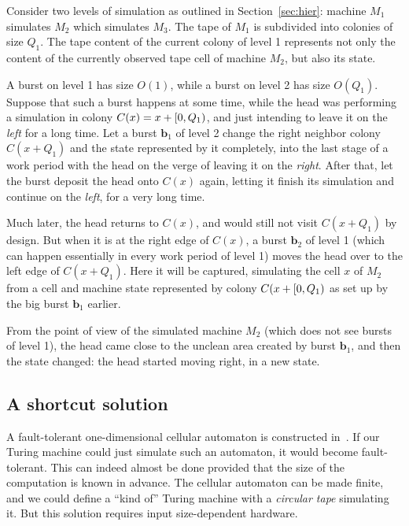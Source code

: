 \documentclass[12pt]{memoir}
\newcommand{\Q}{Q}
\begin{document}
\begin{example}[Uncleanness]
Consider two levels of simulation as outlined in Section~\ref{sec:hier}: 
machine \( M_{1} \) simulates \( M_{2} \) which simulates \( M_{3} \).
The tape of \( M_{1} \) is subdivided into colonies of size \( \Q_{1} \).
The tape content of the 
current colony of level 1 represents not only the content of the currently
observed tape cell of machine \( M_{2} \), but also its state.

A burst on level 1 has size \( O(1) \), while a burst on level 2 has size \( O(\Q_{1}) \).
Suppose that such a burst happens at some time, while the head was
performing a simulation in colony \( C(x)=x+\lint{0}{\Q_{1}} \),
and just intending to leave it on the \emph{left} for a long time.
Let a burst \( \mathbf{b}_{1} \) of level 2 change the right neighbor colony \( C(x+\Q_{1}) \) 
and the state represented by it 
completely, into the last stage of a work period with the 
head on the verge of leaving it on the \emph{right}.
After that, let the burst deposit the head onto \( C(x) \) again, letting it finish
its simulation and continue on the \emph{left}, for a very long time.

Much later, the head returns to \( C(x) \), and would still not visit \( C(x+\Q_{1}) \) by
design.
But when it is at the right edge of \( C(x) \),
a burst \( \mathbf{b}_{2} \) of level 1 (which can happen essentially in every work period of level 1)
moves the head over to the left edge of \( C(x+\Q_{1}) \).
Here it will be captured, simulating the cell \( x \) of \( M_{2} \) from a cell and machine state 
represented by colony \( C(x+\lint{0}{\Q_{1}} \) as set up by 
the big burst \( \mathbf{b}_{1} \) earlier.

From the point of view of the simulated machine \( M_{2} \) (which does not see bursts
of level 1), the head came close to the unclean area created by burst \( \mathbf{b}_{1} \), and then 
the state changed: the head started moving right, in a new state.
\end{example}


\subsection{A shortcut solution}

A fault-tolerant one-dimensional cellular automaton is constructed
in~\cite{GacsSorg01}.
If our Turing machine could just simulate such an automaton, it would become
fault-tolerant.
This can indeed almost be done provided that the size of the computation is known in advance.
The cellular automaton can be made finite, and we could define
a ``kind of'' Turing machine with a \emph{circular tape} simulating it.
But this solution requires input size-dependent hardware.
\end{document}
